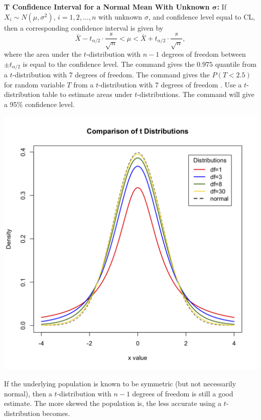 \bbox
\textbf{T Confidence Interval for a Normal Mean With Unknown $\mathbf{\sigma}$:} If $X_i \sim N(\mu, \sigma^2)$, $i=1,2,\ldots , n$ with unknown $\sigma$, and confidence level equal to CL, then a corresponding confidence interval is given by
\[  \bar{X} - t_{\alpha/2} \cdot \frac{s}{\sqrt{n}} < \mu < \bar{X} + t_{\alpha/2} \cdot \frac{s}{\sqrt{n}}, \]
where the area under the $t$-distribution with $n-1$ degrees of freedom between $\pm t_{\alpha/2}$ is equal to the confidence level.
\bi
\ii The command  gives the $0.975$ quantile from a $t$-distribution with 7 degrees of freedom.
\ii The command  gives the $P(T < 2.5)$ for random variable $T$ from a $t$-distribution with 7 degrees of freedom
.
\ii Use a $t$-distribution table to estimate areas under $t$-distributions.
\ii The command  will give a 95\% confidence level.
\ei
\ebox

\begin{multicols}{2}
\begin{center}
\includegraphics[width=0.33\tw]{16/fig-tdist.png}
\end{center}
\columnbreak

\bbox
\bi
\ii If the underlying population is known to be symmetric (but not necessarily  normal), then a $t$-distribution with $n-1$ degrees of freedom is still a good estimate.
\ii The more skewed the population is, the less accurate using a $t$-distribution becomes.
\ei
\ebox
\end{multicols}

